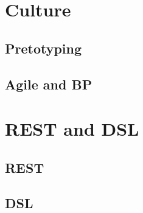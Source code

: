 \documentclass[10pt,unicode,serif,compress,slidetop]{beamer}
\begin{document}
\section{Culture}
\subsection{Pretotyping}

\subsection{Agile and BP}


\section{REST and DSL}
\subsection{REST}

\subsection{DSL}



% 
\end{document}
